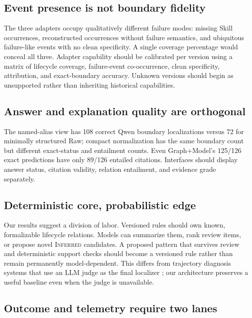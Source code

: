 \documentclass[runningheads]{llncs}
\newcommand{\inferred}{\textsc{Inferred}\xspace}
\begin{document}
\subsection{Event presence is not boundary fidelity}

The three adapters occupy qualitatively different failure modes: missing Skill
occurrences, reconstructed occurrences without failure semantics, and ubiquitous
failure-like events with no clean specificity.  A single coverage percentage
would conceal all three.  Adapter capability should be calibrated per version
using a matrix of lifecycle coverage, failure-event co-occurrence, clean
specificity, attribution, and exact-boundary accuracy. Unknown versions should begin as unsupported rather
than inheriting historical capabilities.

\subsection{Answer and explanation quality are orthogonal}

The named-alias view has 108 correct Qwen boundary localizations versus 72 for
minimally structured Raw; compact normalization has the same boundary count but
different exact-status and entailment counts. Even Graph+Model's 125/126 exact
predictions have only 89/126 entailed citations. Interfaces should display answer
status, citation validity, relation entailment, and evidence grade separately.

\subsection{Deterministic core, probabilistic edge}

Our results suggest a division of labor.  Versioned rules should own known,
formalizable lifecycle relations.  Models can summarize them, rank review
items, or propose novel \inferred candidates.  A proposed pattern that survives
review and deterministic support checks should become a versioned rule rather
than remain permanently model-dependent.  This differs from trajectory
diagnosis systems that use an LLM judge as the final localizer
\cite{agentrx}; our architecture preserves a useful baseline even when the
judge is unavailable.

\subsection{Outcome and telemetry require two lanes}
\end{document}
